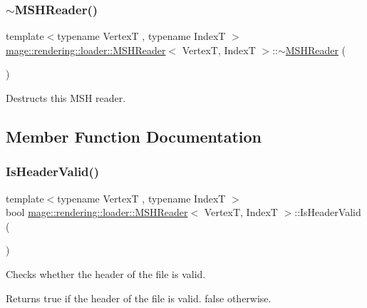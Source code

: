 \subsubsection{\texorpdfstring{$\sim$\+M\+S\+H\+Reader()}{~MSHReader()}}
{\footnotesize\ttfamily template$<$typename VertexT , typename IndexT $>$ \\
\mbox{\hyperlink{classmage_1_1rendering_1_1loader_1_1_m_s_h_reader}{mage\+::rendering\+::loader\+::\+M\+S\+H\+Reader}}$<$ VertexT, IndexT $>$\+::$\sim$\mbox{\hyperlink{classmage_1_1rendering_1_1loader_1_1_m_s_h_reader}{M\+S\+H\+Reader}} (\begin{DoxyParamCaption}{ }\end{DoxyParamCaption})}

Destructs this M\+SH reader. 

\subsection{Member Function Documentation}
\mbox{\label{classmage_1_1rendering_1_1loader_1_1_m_s_h_reader_a7e6948dfb5f5c672719ebe10c4dae6bf}} 
\subsubsection{\texorpdfstring{Is\+Header\+Valid()}{IsHeaderValid()}}
{\footnotesize\ttfamily template$<$typename VertexT , typename IndexT $>$ \\
bool \mbox{\hyperlink{classmage_1_1rendering_1_1loader_1_1_m_s_h_reader}{mage\+::rendering\+::loader\+::\+M\+S\+H\+Reader}}$<$ VertexT, IndexT $>$\+::Is\+Header\+Valid (\begin{DoxyParamCaption}{ }\end{DoxyParamCaption})\hspace{0.3cm}{\ttfamily [private]}}

Checks whether the header of the file is valid.

\begin{DoxyReturn}{Returns}
{\ttfamily true} if the header of the file is valid. {\ttfamily false} otherwise. 
\end{DoxyReturn}
\mbox{\label{classmage_1_1rendering_1_1loader_1_1_m_s_h_reader_a106e5a6cce46777cf7ae36cb4034e1a0}} 
